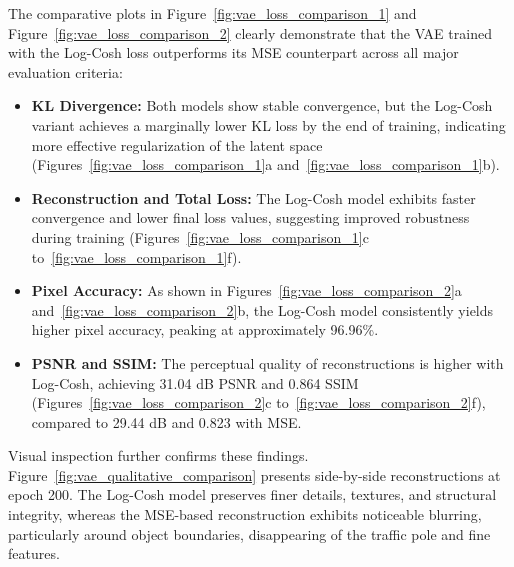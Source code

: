 \clearpage

The comparative plots in Figure~\ref{fig:vae_loss_comparison_1} and Figure~\ref{fig:vae_loss_comparison_2} clearly demonstrate that the VAE trained with the Log-Cosh loss outperforms its MSE counterpart across all major evaluation criteria:

\begin{itemize}
    \item \textbf{KL Divergence:} Both models show stable convergence, but the Log-Cosh variant achieves a marginally lower KL loss by the end of training, indicating more effective regularization of the latent space (Figures~\ref{fig:vae_loss_comparison_1}a and~\ref{fig:vae_loss_comparison_1}b).
    
    \item \textbf{Reconstruction and Total Loss:} The Log-Cosh model exhibits faster convergence and lower final loss values, suggesting improved robustness during training (Figures~\ref{fig:vae_loss_comparison_1}c to~\ref{fig:vae_loss_comparison_1}f).
    
    \item \textbf{Pixel Accuracy:} As shown in Figures~\ref{fig:vae_loss_comparison_2}a and~\ref{fig:vae_loss_comparison_2}b, the Log-Cosh model consistently yields higher pixel accuracy, peaking at approximately 96.96\%.
    
    \item \textbf{PSNR and SSIM:} The perceptual quality of reconstructions is higher with Log-Cosh, achieving 31.04 dB PSNR and 0.864 SSIM (Figures~\ref{fig:vae_loss_comparison_2}c to~\ref{fig:vae_loss_comparison_2}f), compared to 29.44 dB and 0.823 with MSE.
\end{itemize}

Visual inspection further confirms these findings. Figure~\ref{fig:vae_qualitative_comparison} presents side-by-side reconstructions at epoch 200. The Log-Cosh model preserves finer details, textures, and structural integrity, whereas the MSE-based reconstruction exhibits noticeable blurring, particularly around object boundaries, disappearing of the traffic pole and fine features.

